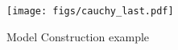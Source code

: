 \begin{figure}
    \centering
    \texttt{[image: figs/cauchy\_last.pdf]}
    \caption{Model Construction example
    }

    \label{fig:rejected2}
\end{figure}
